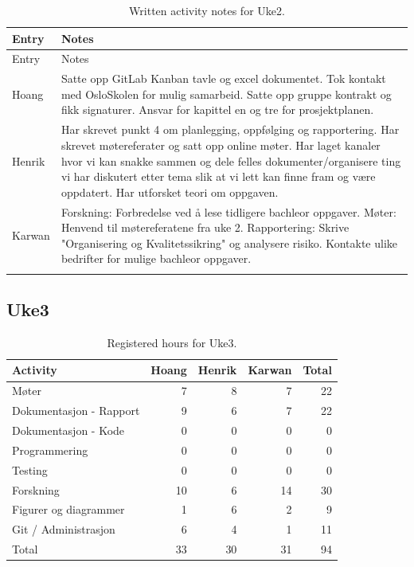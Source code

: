 \begin{longtable}{p{}p{}}
\caption{Written activity notes for Uke2.}\\
\toprule
Entry & Notes \\
\midrule
\endfirsthead
\toprule
Entry & Notes \\
\midrule
\endhead
Hoang & Satte opp GitLab Kanban tavle og excel dokumentet. \newline Tok kontakt med OsloSkolen for mulig samarbeid. \newline Satte opp gruppe kontrakt og fikk signaturer. \newline Ansvar for kapittel en og tre for prosjektplanen. \\
\addlinespace
Henrik & Har skrevet punkt 4 om planlegging, oppfølging og rapportering. Har skrevet møtereferater og satt opp online møter. Har laget kanaler hvor vi kan snakke sammen og dele felles dokumenter/organisere ting vi har diskutert etter tema slik at vi lett kan finne fram og være oppdatert. Har utforsket teori om oppgaven. \\
\addlinespace
Karwan & Forskning: Forbredelse ved å lese tidligere bachleor oppgaver. Møter: Henvend til møtereferatene fra uke 2. Rapportering: Skrive "Organisering og Kvalitetssikring" og analysere risiko. Kontakte ulike bedrifter for mulige bachleor oppgaver. \\
\addlinespace
\bottomrule
\end{longtable}

\subsection{Uke3}

\begin{table}[H]
\centering
\small
\caption{Registered hours for Uke3.}
\label{tab:project-hours-uke3}
\begin{tabular}{lrrrr}
\toprule
Activity & Hoang & Henrik & Karwan & Total \\
\midrule
Møter & 7 & 8 & 7 & 22 \\
Dokumentasjon - Rapport & 9 & 6 & 7 & 22 \\
Dokumentasjon - Kode & 0 & 0 & 0 & 0 \\
Programmering & 0 & 0 & 0 & 0 \\
Testing & 0 & 0 & 0 & 0 \\
Forskning & 10 & 6 & 14 & 30 \\
Figurer og diagrammer & 1 & 6 & 2 & 9 \\
Git / Administrasjon & 6 & 4 & 1 & 11 \\
\midrule
Total & 33 & 30 & 31 & 94 \\
\bottomrule
\end{tabular}
\end{table}

